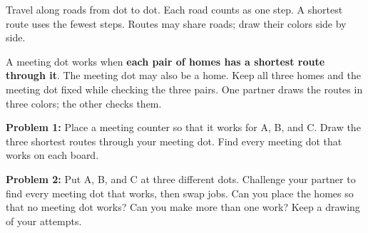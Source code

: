 \documentclass[12pt,letterpaper]{article}
\newcommand{\problem}[2]{\par\textbf{Problem #1:} #2\par}
\newcommand{\grid}[1]{\draw[gray!65,line width=.6pt,step=1] (0,0) grid (#1,#1);\foreach \x in {0,...,#1}\foreach \y in {0,...,#1}\fill (\x,\y) circle (1.7pt);}
\newcommand{\home}[3]{\node[draw,circle,fill=white,inner sep=3pt,font=\bfseries] at (#1,#2){#3};}
\begin{document}
Travel along roads from dot to dot. Each road counts as one step. A shortest route uses the fewest steps. Routes may share roads; draw their colors side by side.

A meeting dot works when \textbf{each pair of homes has a shortest route through it}. The meeting dot may also be a home. Keep all three homes and the meeting dot fixed while checking the three pairs. One partner draws the routes in three colors; the other checks them.

\begin{center}
\end{center}
\problem{1}{Place a meeting counter so that it works for A, B, and C. Draw the three shortest routes through your meeting dot. Find every meeting dot that works on each board.}
\vspace{.25in}
\begin{center}
\hfill
{}
\end{center}
\vfill
\newpage
\problem{2}{Put A, B, and C at three different dots. Challenge your partner to find every meeting dot that works, then swap jobs. Can you place the homes so that no meeting dot works? Can you make more than one work? Keep a drawing of your attempts.}
\vspace{.25in}
\begin{center}
\hfill
{}
\vspace{.6in}

\hfill
{}
\end{center}
\end{document}
